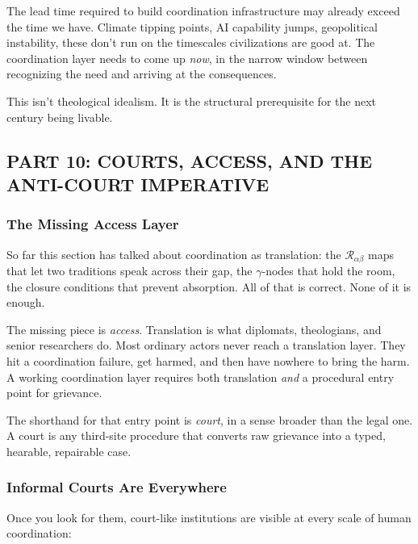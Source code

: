 \documentclass[
]{article}
\begin{document}
The lead time required to build coordination infrastructure may already
exceed the time we have. Climate tipping points, AI capability jumps,
geopolitical instability, these don't run on the timescales
civilizations are good at. The coordination layer needs to come up
\emph{now}, in the narrow window between recognizing the need and
arriving at the consequences.

This isn't theological idealism. It is the structural prerequisite for
the next century being livable.

\subsection{PART 10: COURTS, ACCESS, AND THE ANTI-COURT
IMPERATIVE}\label{part-10-courts-access-anti-court}

\subsubsection{The Missing Access Layer}\label{the-missing-access-layer}

So far this section has talked about coordination as translation: the
\(\mathcal{R}_{\alpha\beta}\) maps that let two traditions speak
across their gap, the \(\gamma\)-nodes that hold the room, the closure
conditions that prevent absorption. All of that is correct. None of
it is enough.

The missing piece is \emph{access}. Translation is what diplomats,
theologians, and senior researchers do. Most ordinary actors never
reach a translation layer. They hit a coordination failure, get
harmed, and then have nowhere to bring the harm. A working
coordination layer requires both translation \emph{and} a procedural
entry point for grievance.

The shorthand for that entry point is \emph{court}, in a sense
broader than the legal one. A court is any third-site procedure that
converts raw grievance into a typed, hearable, repairable case.

\subsubsection{Informal Courts Are
Everywhere}\label{informal-courts-everywhere}

Once you look for them, court-like institutions are visible at every
scale of human coordination:
\end{document}
